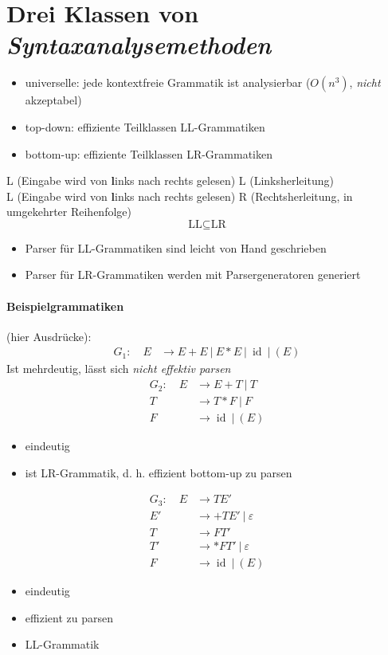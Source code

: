 \section{Drei Klassen von \emph{Syntaxanalysemethoden}}
\begin{itemize}
 \item universelle: jede kontextfreie Grammatik ist analysierbar ($O(n^3)$, \emph{nicht} akzeptabel)
 \item top-down: effiziente Teilklassen LL-Grammatiken
 \item bottom-up: effiziente Teilklassen LR-Grammatiken
\end{itemize}
L (Eingabe wird von \textbf{l}inks nach rechts gelesen) L (Linksherleitung)\\
L (Eingabe wird von \textbf{l}inks nach rechts gelesen) R (Rechtsherleitung, in umgekehrter Reihenfolge)
\[\text{LL} \subseteq \text{LR}\]
\begin{itemize}
 \item Parser für LL-Grammatiken sind leicht von Hand geschrieben
 \item Parser für LR-Grammatiken werden mit Parsergeneratoren generiert
\end{itemize}

\paragraph*{Beispielgrammatiken} (hier Ausdrücke):
\begin{align*}
 G_1{:} \quad E &\to E + E\ |\ E * E\ |\ \operatorname{id}\ |\ (E)
\end{align*}
Ist mehrdeutig, lässt sich \emph{nicht effektiv parsen}
\begin{align*}
 G_2{:} \quad E &\to E + T\ |\ T\\
 T &\to T * F\ |\ F\\
 F &\to \operatorname{id}\ |\ (E)
\end{align*}
\begin{itemize}
 \item eindeutig
 \item ist LR-Grammatik, d. h. effizient bottom-up zu parsen
\end{itemize}
\begin{align*}
 G_3{:} \quad E &\to TE'\\
 E' &\to + TE'\ |\ \varepsilon\\
 T &\to FT' \\
 T' &\to *FT'\ |\ \varepsilon\\
 F &\to \operatorname{id}\ |\ (E)
\end{align*}
\begin{itemize}
 \item eindeutig
 \item effizient zu parsen
 \item LL-Grammatik
\end{itemize}

